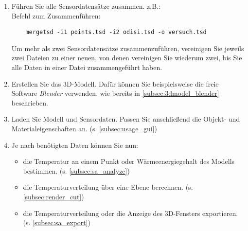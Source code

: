 \documentclass[10pt,a5paper,twoside,titlepage]{scrartcl}
\begin{document}
\begin{enumerate}
	\item Führen Sie alle Sensordatensätze zusammen. z.B.:\\
	Befehl zum Zusammenführen:
	\begin{lstlisting}
	mergetsd -i1 points.tsd -i2 odisi.tsd -o versuch.tsd
	\end{lstlisting}	
	Um mehr als zwei Sensordatensätze zusammenzuführen, vereinigen Sie jeweils zwei Dateien zu einer neuen, von denen vereinigen Sie wiederum zwei, bis Sie alle Daten in einer Datei zusammengeführt haben.
	\item Erstellen Sie das 3D-Modell. Dafür können Sie beispielsweise die freie Software \emph{Blender} verwenden, wie bereits in \ref{subsec:3dmodel_blender} beschrieben.
	\item Laden Sie Modell und Sensordaten. Passen Sie anschließend die Objekt- und Materialeigenschaften an. (s. \ref{subsec:usage_gui})
	\item Je nach benötigten Daten können Sie nun:
	\begin{itemize}
	\item die Temperatur an einem Punkt oder Wärmeenergiegehalt des Modells bestimmen. (s. \ref{subsec:sa_analyze})
	\item die Temperaturverteilung über eine Ebene berechnen. (s. \ref{subsec:render_cut})
	\item die Temperaturverteilung oder die Anzeige des 3D-Fensters exportieren. (s. \ref{subsec:sa_export})
	\end{itemize}
	\end{enumerate}
	\label{sec:example}
\end{document}
